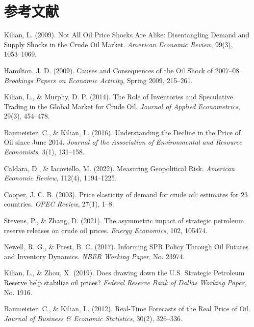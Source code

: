 \section*{参考文献}

\begin{enumerate}[label={[\arabic*]},leftmargin=2.2em,itemsep=0.42em,topsep=0.25em]
\item
Kilian, L. (2009). Not All Oil Price Shocks Are Alike: Disentangling Demand and Supply Shocks in the Crude Oil Market. \textit{American Economic Review}, 99(3), 1053--1069.

\item
Hamilton, J. D. (2009). Causes and Consequences of the Oil Shock of 2007--08. \textit{Brookings Papers on Economic Activity}, Spring 2009, 215--261.

\item
Kilian, L., \& Murphy, D. P. (2014). The Role of Inventories and Speculative Trading in the Global Market for Crude Oil. \textit{Journal of Applied Econometrics}, 29(3), 454--478.

\item
Baumeister, C., \& Kilian, L. (2016). Understanding the Decline in the Price of Oil since June 2014. \textit{Journal of the Association of Environmental and Resource Economists}, 3(1), 131--158.

\item
Caldara, D., \& Iacoviello, M. (2022). Measuring Geopolitical Risk. \textit{American Economic Review}, 112(4), 1194--1225.

\item
Cooper, J. C. B. (2003). Price elasticity of demand for crude oil: estimates for 23 countries. \textit{OPEC Review}, 27(1), 1--8.

\item
Stevens, P., \& Zhang, D. (2021). The asymmetric impact of strategic petroleum reserve releases on crude oil prices. \textit{Energy Economics}, 102, 105474.

\item
Newell, R. G., \& Prest, B. C. (2017). Informing SPR Policy Through Oil Futures and Inventory Dynamics. \textit{NBER Working Paper}, No. 23974.

\item
Kilian, L., \& Zhou, X. (2019). Does drawing down the U.S. Strategic Petroleum Reserve help stabilize oil prices? \textit{Federal Reserve Bank of Dallas Working Paper}, No. 1916.

\item
Baumeister, C., \& Kilian, L. (2012). Real-Time Forecasts of the Real Price of Oil. \textit{Journal of Business \& Economic Statistics}, 30(2), 326--336.


\end{enumerate}
